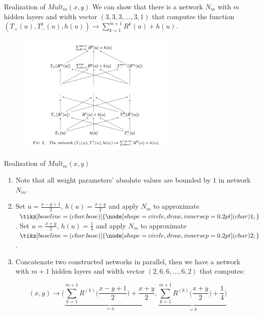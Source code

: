 \documentclass{if-beamer}
\newcommand*\circled[1]{\tikz[baseline=(char.base)]{
            \node[shape=circle,draw,inner sep=0.2pt] (char) {#1};}}
\begin{document}
\begin{frame}{Realization of $Mult_{m}(x,y)$}
    We can show that there is a network $N_m$ with $m$ hidden layers and width vector $(3,3,3,\dots,3,1)$ that computes the function $(T_{+}(u),T_{-}^{1}(u),h(u))\rightarrow{\sum_{k=1}^{m+1}R^{k}(u)+h(u)}$.
    \begin{figure}[htbp]
        \includegraphics[width=0.7\textwidth]{approx_prod.png}
        \label{fig:figure3}
    \end{figure}
\end{frame}

\begin{frame}{Realization of $Mult_{m}(x,y)$}
    \begin{enumerate}
        \item Note that all weight parameters' absolute values are bounded by $1$ in network $N_m$.
        \item Set $u=\frac{x-y+1}{2}$, $h(u)=\frac{x+y}{2}$ and apply $N_m$ to approximate $\circled{1}$. Set $u=\frac{x+y}{2}$, $h(u)=\frac{1}{4}$ and apply $N_m$ to approximate $\circled{2}$. 
        \item Concatenate two constructed networks in parallel, then we have a network with $m+1$ hidden layers and width vector $(2,6,6,\dots,6,2)$ that computes:
    \end{enumerate}
     \begin{equation*}
        (x,y) \rightarrow{\bigg(\underbrace{\sum_{k=1}^{m+1}R^{(k)}\bigg(\frac{x-y+1}{2}\bigg)+\frac{x+y}{2}}_{=a},\underbrace{\sum_{k=1}^{m+1}R^{(k)}\bigg(\frac{x+y}{2}\bigg)+\frac{1}{4}\bigg)}_{=b}}
    \end{equation*}
\end{frame}
\end{document}
